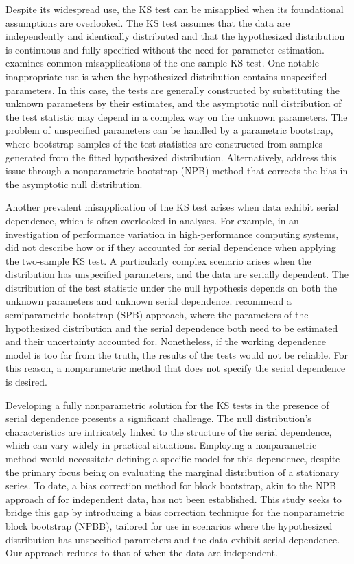 \documentclass[APA,Times1COL]{WileyNJDv5} %
\begin{document}
Despite its widespread use, the KS test can be 
misapplied when its foundational assumptions are overlooked. The KS test 
assumes that the data are independently and identically distributed and 
that the hypothesized distribution is continuous and fully specified without 
the need for parameter estimation. \citet{zeimbekakis2022misuses} examines
common misapplications of the one-sample KS test. One notable inappropriate
use is when the hypothesized distribution contains unspecified parameters.
In this case, the tests are generally constructed by substituting the unknown
parameters by their estimates, and the asymptotic null distribution of
the test statistic may depend in a complex way on the unknown parameters.
The problem of unspecified parameters can be handled by a parametric
bootstrap, where bootstrap samples of the test statistics are constructed from
samples generated from the fitted hypothesized distribution.
Alternatively, \citet{babu2004goodness} address this issue through a
nonparametric bootstrap (NPB) method that corrects the bias in the asymptotic null
distribution.


Another prevalent misapplication of the KS test arises when data exhibit serial
dependence, which is often overlooked in analyses. For example, in an
investigation of performance variation in high-performance computing systems,
\citet{tuncer2019ieee} did not describe how or if they accounted for serial
dependence when applying the two-sample KS test.
A particularly complex scenario arises when the distribution has unspecified
parameters, and the data are serially dependent.
The distribution of the test statistic under the null hypothesis depends on both
the unknown parameters and unknown serial dependence. 
\citet{zeimbekakis2022misuses} recommend a semiparametric bootstrap (SPB)
approach, where the parameters of the hypothesized distribution and the serial
dependence both need to be estimated and their uncertainty accounted for.
Nonetheless, if the working dependence model is too far from the truth, the
results of the tests would not be reliable. For this reason, a nonparametric
method that does not specify the serial dependence is desired.


Developing a fully nonparametric solution for the KS 
tests in the presence of serial dependence presents a significant 
challenge. The null distribution's characteristics are intricately linked to 
the structure of the serial dependence, which can vary widely in practical 
situations. Employing a nonparametric method would necessitate defining a 
specific model for this dependence, despite the primary focus being on 
evaluating the marginal distribution of a stationary series. To date, a bias 
correction method for block bootstrap, akin to the NPB
approach of \citet{babu2004goodness} for independent data,
has not been established. This study seeks 
to bridge this gap by introducing a bias correction technique for the 
nonparametric block bootstrap (NPBB), tailored for use in scenarios where the 
hypothesized distribution has unspecified parameters and the data 
exhibit serial dependence. Our approach reduces to that of
\citet{babu2004goodness} when the data are independent. 
\end{document}

